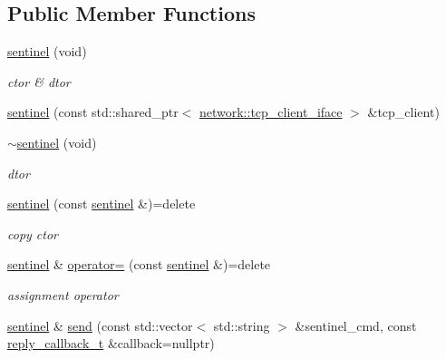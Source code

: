 \subsection*{Public Member Functions}
\begin{DoxyCompactItemize}
\item 
\hyperlink{classcpp__redis_1_1sentinel_a2ea5a80a9139d5192706988521a2ae34}{sentinel} (void)
\begin{DoxyCompactList}\small\item\em ctor \& dtor \end{DoxyCompactList}\item 
\hyperlink{classcpp__redis_1_1sentinel_af53665f5834dfe5861a6310318ae5169}{sentinel} (const std\+::shared\+\_\+ptr$<$ \hyperlink{classcpp__redis_1_1network_1_1tcp__client__iface}{network\+::tcp\+\_\+client\+\_\+iface} $>$ \&tcp\+\_\+client)
\item 
\mbox{\label{classcpp__redis_1_1sentinel_af8535e89714db8ddcd7e74337ee5385a}} 
\hyperlink{classcpp__redis_1_1sentinel_af8535e89714db8ddcd7e74337ee5385a}{$\sim$sentinel} (void)
\begin{DoxyCompactList}\small\item\em dtor \end{DoxyCompactList}\item 
\mbox{\label{classcpp__redis_1_1sentinel_a4c3b68f6e930b2e9723816bb8bed5a8f}} 
\hyperlink{classcpp__redis_1_1sentinel_a4c3b68f6e930b2e9723816bb8bed5a8f}{sentinel} (const \hyperlink{classcpp__redis_1_1sentinel}{sentinel} \&)=delete
\begin{DoxyCompactList}\small\item\em copy ctor \end{DoxyCompactList}\item 
\mbox{\label{classcpp__redis_1_1sentinel_a06b8d049160e3990cdac3158aaf160a6}} 
\hyperlink{classcpp__redis_1_1sentinel}{sentinel} \& \hyperlink{classcpp__redis_1_1sentinel_a06b8d049160e3990cdac3158aaf160a6}{operator=} (const \hyperlink{classcpp__redis_1_1sentinel}{sentinel} \&)=delete
\begin{DoxyCompactList}\small\item\em assignment operator \end{DoxyCompactList}\item 
\hyperlink{classcpp__redis_1_1sentinel}{sentinel} \& \hyperlink{classcpp__redis_1_1sentinel_a0df522dbd7debda4e73f616a62d6f5ee}{send} (const std\+::vector$<$ std\+::string $>$ \&sentinel\+\_\+cmd, const \hyperlink{classcpp__redis_1_1sentinel_ae1a150ff8787208c47414397a061c9a7}{reply\+\_\+callback\+\_\+t} \&callback=nullptr)

\end{DoxyCompactItemize}
